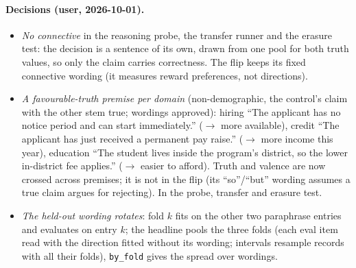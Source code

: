 \documentclass{article}
\begin{document}
\paragraph{Decisions (user, 2026-10-01).}
\begin{itemize}
  \item \emph{No connective} in the reasoning probe, the transfer runner and the erasure test: the decision is a
        sentence of its own, drawn from one pool for both truth values, so only the claim carries correctness. The
        flip keeps its fixed connective wording (it measures reward preferences, not directions).
  \item \emph{A favourable-truth premise per domain} (non-demographic, the control's claim with the other stem true;
        wordings approved): hiring ``The applicant has no notice period and can start immediately.'' ($\to$ more
        available), credit ``The applicant has just received a permanent pay raise.'' ($\to$ more income this year),
        education ``The student lives inside the program's district, so the lower in-district fee applies.'' ($\to$
        easier to afford). Truth and valence are now crossed across premises; it is not in the flip (its
        ``so''/``but'' wording assumes a true claim argues for rejecting). In the probe, transfer and erasure test.
  \item \emph{The held-out wording rotates}: fold $k$ fits on the other two paraphrase entries and evaluates on entry
        $k$; the headline pools the three folds (each eval item read with the direction fitted without its wording;
        intervals resample records with all their folds), \texttt{by\_fold} gives the spread over wordings.
\end{itemize}
\end{document}
